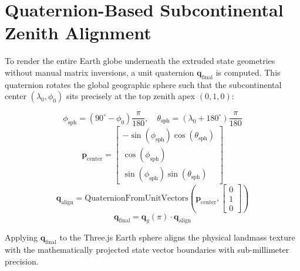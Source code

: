 \documentclass[11pt,a4paper]{report}
\begin{document}
\section{Quaternion-Based Subcontinental Zenith Alignment}
To render the entire Earth globe underneath the extruded state geometries without manual matrix inversions, a unit quaternion $\mathbf{q}_{\text{final}}$ is computed. This quaternion rotates the global geographic sphere such that the subcontinental center $(\lambda_0, \phi_0)$ sits precisely at the top zenith apex $(0, 1, 0)$:

\begin{equation}
    \phi_{\text{sph}} = (90^\circ - \phi_0)\frac{\pi}{180}, \quad \theta_{\text{sph}} = (\lambda_0 + 180^\circ)\frac{\pi}{180}
\end{equation}
\begin{equation}
    \mathbf{p}_{\text{center}} = \begin{bmatrix}
        -\sin(\phi_{\text{sph}}) \cos(\theta_{\text{sph}}) \\
        \cos(\phi_{\text{sph}}) \\
        \sin(\phi_{\text{sph}}) \sin(\theta_{\text{sph}})
    \end{bmatrix}
\end{equation}
\begin{equation}
    \mathbf{q}_{\text{align}} = \text{QuaternionFromUnitVectors}(\mathbf{p}_{\text{center}}, \begin{bmatrix} 0 \\ 1 \\ 0 \end{bmatrix})
\end{equation}
\begin{equation}
    \mathbf{q}_{\text{final}} = \mathbf{q}_y(\pi) \cdot \mathbf{q}_{\text{align}}
\end{equation}

Applying $\mathbf{q}_{\text{final}}$ to the Three.js Earth sphere aligns the physical landmass texture with the mathematically projected state vector boundaries with sub-millimeter precision.
\end{document}

